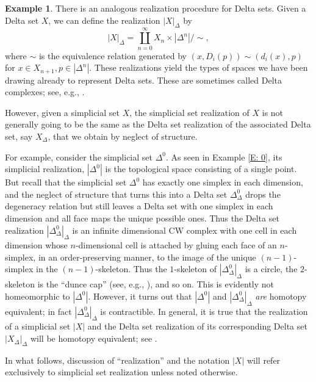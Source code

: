 \documentclass[12pt]{article}
\theoremstyle{plain}
\theoremstyle{definition}
\newtheorem{example}[theorem]{Example}
\begin{document}
\begin{example}
There is an analogous realization procedure for Delta sets. Given a Delta set $X$, we can define
the realization $|X|_{\Delta}$ by $$|X|_{\Delta}=\displaystyle\coprod_{n=0}^\infty X_n\times |\Delta^n|/\sim,$$
where $\sim$ is the equivalence relation generated by $(x,D_i(p))\sim(d_i(x),p)$ for $x\in X_{n+1}, p\in |\Delta^n|$. These realizations yield the types of spaces we have been drawing already to represent Delta sets. These are sometimes called Delta complexes; see, e.g., \cite{Ha}.

However, given a simplicial set $X$, the simplicial set realization of  $X$ is not generally going to be the same as the Delta set realization of the associated Delta set, say $X_{\Delta}$, that we obtain by neglect of structure. 

For example, consider the simplicial set $\Delta^0$. As seen in Example \ref{E: 0}, its simplicial realization, $|\Delta^0|$ is the topological space consisting of a single point. But recall that the simplicial set $\Delta^0$ has exactly one simplex in each dimension, and the neglect of structure that turns this into a Delta set $\Delta^0_\Delta$ drops the degeneracy relation but still leaves a Delta set with one simplex in each dimension and all face maps the unique possible ones. Thus the Delta set realization  $|\Delta^0_{\Delta}|_{\Delta}$ is an infinite dimensional CW complex with one cell in each dimension whose $n$-dimensional cell is attached by gluing each face of an $n$-simplex, in an order-preserving manner,   to the image of the unique $(n-1)$-simplex in the $(n-1)$-skeleton. Thus the $1$-skeleton of $|\Delta^0_{\Delta}|_{\Delta}$ is a circle, the $2$-skeleton is the ``dunce cap'' (see, e.g., \cite[Section 14]{BRTG}), and so on. This is evidently not homeomorphic to $|\Delta^0|$. However, it turns out that $|\Delta^0|$ and $|\Delta^0_{\Delta}|_{\Delta}$ \emph{are} homotopy equivalent; in fact $|\Delta^0_{\Delta}|_{\Delta}$ is contractible. In general, it is true that the realization of a simplicial set $|X|$ and the Delta set realization of its corresponding Delta set $|X_\Delta|_\Delta$  will be homotopy equivalent; see \cite{RSDelta}.


In what follows, discussion of ``realization'' and the notation $|X|$ will refer exclusively to simplicial set realization unless noted otherwise.
\end{example}
\end{document}
